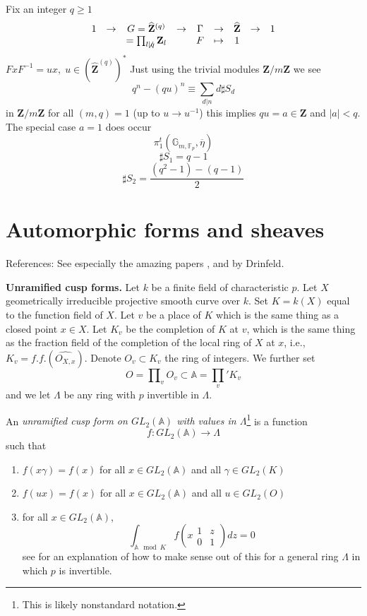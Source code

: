 \begin{example}
Fix an integer $q\geq 1$
$$
\begin{array}{cccccccccccccccc}
1 & \to & G=\widehat{\mathbf{Z}}^{(q)}&\to &\Gamma&\to &
		\widehat{\mathbf{Z}} &\to &1\\
		& &= \prod_{l\not \mid q}\mathbf{Z}_l & & F & \mapsto & 1
		\end{array}$$
	$FxF^{-1}=ux, \; u\in (\widehat{\mathbf{Z}}^{(q)})^*$ Just using the 
trivial modules $\mathbf{Z}/m\mathbf{Z}$ we see
		$$q^n-(qu)^n\equiv \sum_{d|n} d\sharp S_d$$
		in $\mathbf{Z}/m\mathbf{Z}$ for all $(m, q)=1$ (up to $u\to 
u^{-1}$) this implies $qu=a\in \mathbf{Z}$ and $|a|<q$. The special case $a=1$ 
does occur 
		$$\pi_1^t(\mathbb G_{m, \mathbb F_p}, \overline \eta)$$
		$$\sharp S_1 = q-1$$
		$$\sharp S_2 = \frac{(q^2-1)-(q-1)}{2}$$


		
\end{example}



\section{Automorphic forms and sheaves}
\label{section-automorphic}

\noindent
References: See especially the amazing papers
\cite{D1}, \cite{D2} and \cite{D0} by Drinfeld.

\medskip\noindent
{\bf Unramified cusp forms.}
Let $k$ be a finite field of characteristic $p$.
Let $X$ geometrically irreducible projective smooth curve over $k$.
Set $K = k(X)$ equal to the function field of $X$.
Let $v$ be a place of $K$ which is the same thing as a
closed point $x\in X$. Let $K_v$ be the completion of $K$ at $v$, which
is the same thing as the fraction field of the completion of
the local ring of $X$ at $x$, i.e., $K_v = f.f.(\widehat{O_{X, x}})$.
Denote $O_v\subset K_v$ the ring of integers. We further set
$$
O = \prod\nolimits_v O_v \subset \mathbb A = \prod_v' K_v
$$
and we let $\Lambda$ be any ring with $p$ invertible in $\Lambda$.

\begin{definition}
\label{definition-unramified}
An {\it unramified cusp form on $GL_2(\mathbb{A})$ with values in
$\Lambda$}\footnote{This is likely nonstandard notation.}
is a function
$$
f: GL_2(\mathbb{A}) \to \Lambda
$$
such that
\begin{enumerate}
\item $f(x\gamma) = f(x)$ for all $x\in GL_2(\mathbb{A})$ and all
$\gamma\in GL_2(K)$
\item $f(ux) = f(x)$ for all $x\in GL_2(\mathbb{A})$ and all $u\in GL_2(O)$
\item for all $x\in GL_2(\mathbb{A})$, 
$$
\int_{\mathbb{A} \mod K}f\left(x\begin{matrix}1 & z\\ 0 & 
1\end{matrix} \right)dz = 0
$$
see \cite[Section 4.1]{dJ-conjecture}
for an explanation of how to make sense out
of this for a general ring $\Lambda$ in which $p$ is invertible.
\end{enumerate}
\end{definition}

